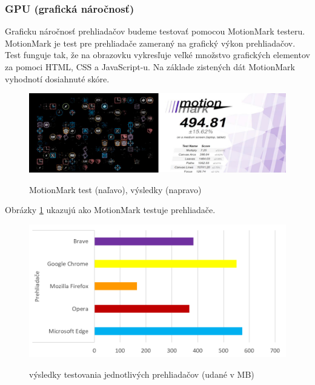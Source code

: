 \documentclass[10pt,Slovak,a4paper]{article}
\begin{document}
    \subsubsection{GPU (grafická náročnosť)}
    \begin{paragraph}
    Graficku náročnosť prehliadačov budeme testovať pomocou MotionMark testeru. MotionMark je test pre prehliadače zameraný na grafický výkon prehliadačov. Test funguje tak, že na obrazovku vykresľuje veľké množstvo grafických elementov za pomoci HTML, CSS a JavaScript-u. Na základe zistených dát MotionMark vyhodnotí dosiahnuté skóre. 

    \begin{figure}[h]
        \centering
        \includegraphics[scale=.7]{motionmark.png}
        \cite{img3}
        \caption{MotionMark test (naľavo), výsledky (napravo)}
        \label{img3}
    \end{figure} 

    Obrázky \ref{img3} ukazujú ako MotionMark testuje prehliadače.\\

    \begin{figure}[h]
        \centering
        \includegraphics[scale=.8]{graph4.png}
        \cite{graph4}
        \caption{výsledky testovania jednotlivých prehliadačov (udané v MB)}
        \label{graph4}
    \end{figure}  

    
        \cite{browser_comparison}
    \end{paragraph}
\end{document}

